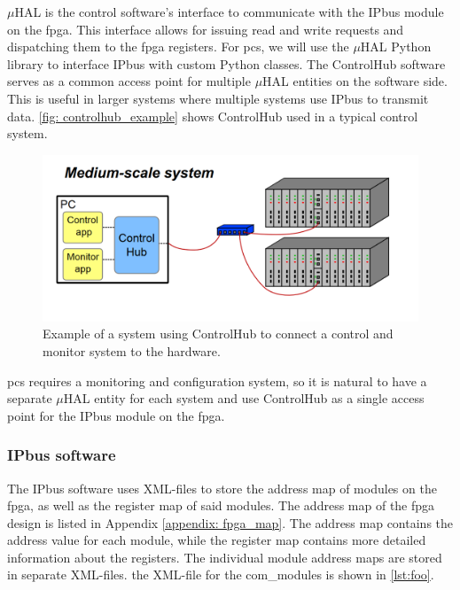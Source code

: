\documentclass[main.tex]{subfiles}
\begin{document}
$\mu$HAL is the control software's interface to communicate with the IPbus module on the \gls{fpga}. This interface allows for issuing read and write requests and dispatching them to the \gls{fpga} registers. For \gls{pcs}, we will use the $\mu$HAL Python library to interface IPbus with custom Python classes. The ControlHub software serves as a common access point for multiple $\mu$HAL entities on the software side. This is useful in larger systems where multiple systems use IPbus to transmit data. \autoref{fig: controlhub_example} shows ControlHub used in a typical control system.

\begin{figure}[!htpb]
    \centering
    \includegraphics[scale=0.3]{images/controlhub_example.png}
    \caption{Example of a system using ControlHub to connect a control and monitor system to the hardware\cite{IPbus}.}
    \label{fig: controlhub_example}
\end{figure}
\FloatBarrier

\gls{pcs} requires a monitoring and configuration system, so it is natural to have a separate $\mu$HAL entity for each system and use ControlHub as a single access point for the IPbus module on the \gls{fpga}.

\subsubsection{IPbus software}

The IPbus software uses XML-files to store the address map of modules on the \gls{fpga}, as well as the register map of said modules. The address map of the \gls{fpga} design is listed in Appendix \ref{appendix: fpga_map}. The address map contains the address value for each module, while the register map contains more detailed information about the registers. The individual module address maps are stored in separate XML-files. the XML-file for the com\_modules is shown in \autoref{lst:foo}.
\end{document}
